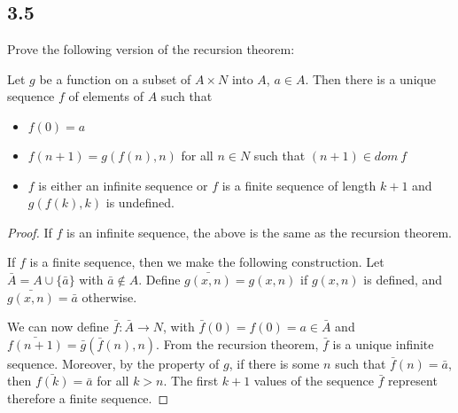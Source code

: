 \subsection*{3.5} Prove the following version of the recursion theorem:

Let $g$ be a function on a subset of $A \times N$ into $A$, $a \in A$. Then there is a unique sequence $f$ of elements of $A$ such that

\begin{itemize}
    \item $f(0) = a$
    \item $f(n+1) = g(f(n), n)$ for all $n \in N$ such that $(n+1) \in dom~f$
    \item $f$ is either an infinite sequence or $f$ is a finite sequence of length $k+1$ and $g(f(k), k)$ is undefined.
\end{itemize}

\begin{proof}
If $f$ is an infinite sequence, the above is the same as the recursion theorem.

If $f$ is a finite sequence, then we make the following construction.
Let $\bar{A} = A \cup \{\bar{a}\}$ with $\bar{a} \notin A$. Define $\bar{g(x,n)} = g(x,n)$ if $g(x, n)$ is defined, and $\bar{g(x,n)} = \bar{a}$ otherwise.

We can now define $\bar{f}: \bar{A} \rightarrow N$, with $\bar{f}(0) = f(0) = a \in \bar{A}$ and $\bar{f(n+1)} = \bar{g}(\bar{f}(n), n)$. From the recursion theorem, $\bar{f}$ is a unique infinite sequence. Moreover, by the property of $g$, if there is some $n$ such that $\bar{f}(n) = \bar{a}$, then $\bar{f(k)} = \bar{a}$ for all $k > n$. The first $k+1$ values of the sequence $\bar{f}$ represent therefore a finite sequence.

\end{proof}

